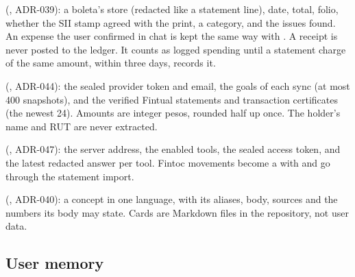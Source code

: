 \begin{description}[style=nextline,leftmargin=1.2em]
  \item[\code{StoredReceipt}] (, ADR-039): a boleta's store (redacted like a statement
    line), date, total, folio, whether the SII stamp agreed with the print, a category, and the issues found. An
    expense the user confirmed in chat is kept the same way with . A receipt is never posted to
    the ledger. It counts as logged spending until a statement charge of the same amount, within three days, records it.
  \item[\code{InvestmentLink}, \code{InvestmentSnapshot}, \code{StoredInvestmentDocument}] (,
    ADR-044): the sealed provider token and email, the goals of each sync (at most 400 snapshots), and the verified
    Fintual statements and transaction certificates (the newest 24). Amounts are integer pesos, rounded half up once.
    The holder's name and RUT are never extracted.
  \item[\code{Connection}, \code{ConnectionSnapshot}] (, ADR-047): the server
    address, the enabled tools, the sealed access token, and the latest redacted answer per tool. Fintoc movements
    become a  with  and go through the statement import.
  \item[\code{ConceptCard}] (, ADR-040): a concept in one language, with its
    aliases, body, sources and the numbers its body may state. Cards are Markdown files in the repository, not user
    data.
\end{description}

\subsection{User memory}\label{sec:memory-data}

